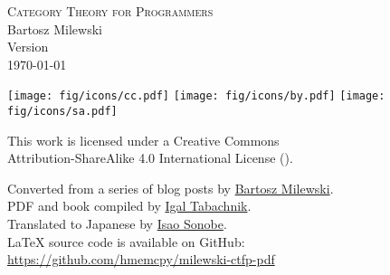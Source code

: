 \begin{small}
  \begin{center}

    \textsc{Category Theory for Programmers}\\

    \vspace{1.0em}
    \noindent
    Bartosz Milewski\\

    \vspace{1.26em}
    \noindent
    Version \texttt{\OPTversion}\\\today


    \vspace{1.6em}
    \noindent
    \texttt{[image: fig/icons/cc.pdf]}
    \texttt{[image: fig/icons/by.pdf]}
    \texttt{[image: fig/icons/sa.pdf]}

    \vspace{0.4em}
    \noindent
    This work is licensed under a Creative Commons\\
    Attribution-ShareAlike 4.0 International License
    (\href{http://creativecommons.org/licenses/by-sa/4.0/}{}).

    \vspace{1.26em}
    \noindent
    Converted from a series of blog posts by \href{https://bartoszmilewski.com/2014/10/28/category-theory-for-programmers-the-preface/}{Bartosz Milewski}.\\
    PDF and book compiled by \href{https://hmemcpy.com}{Igal Tabachnik}.\\
    Translated to Japanese by \href{https://github.com/sonoisa}{Isao Sonobe}.\\
    \vspace{1.26em}
    \noindent
    \LaTeX{} source code is available on GitHub: \href{https://github.com/hmemcpy/milewski-ctfp-pdf}{https://github.com/hmemcpy/milewski-ctfp-pdf}
  \end{center}
\end{small}
